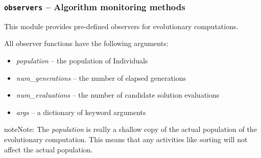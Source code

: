 \documentclass[letterpaper,10pt,english]{sphinxmanual}
\begin{document}
\label{reference:module-inspyred.ec.observers}

\subsubsection{\texttt{observers} -- Algorithm monitoring methods}
\label{reference:observers-algorithm-monitoring-methods}
This module provides pre-defined observers for evolutionary computations.

All observer functions have the following arguments:
\begin{itemize}
\item {} 
\emph{population} -- the population of Individuals

\item {} 
\emph{num\_generations} -- the number of elapsed generations

\item {} 
\emph{num\_evaluations} -- the number of candidate solution evaluations

\item {} 
\emph{args} -- a dictionary of keyword arguments

\end{itemize}

\begin{notice}{note}{Note:}
The \emph{population} is really a shallow copy of the actual population of
the evolutionary computation. This means that any activities like
sorting will not affect the actual population.
\end{notice}
\label{reference:module-observers}
\end{document}
